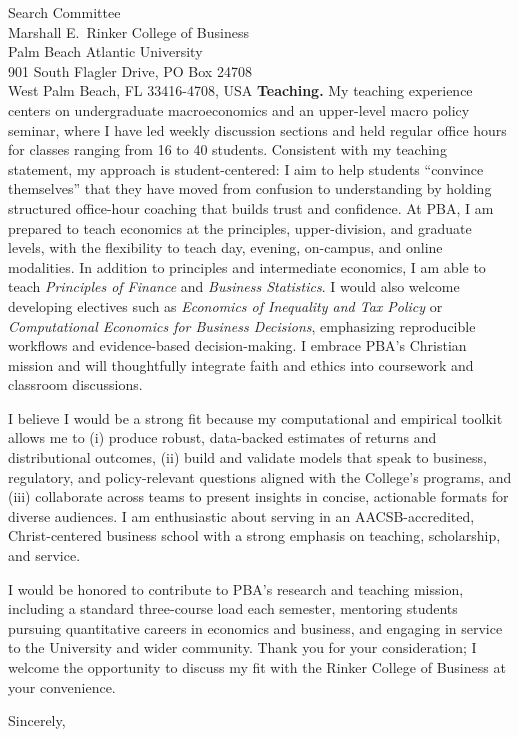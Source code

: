 \documentclass[11pt,letterpaper]{letter}
\begin{document}
\begin{letter}{Search Committee \\
Marshall E.~Rinker College of Business \\
Palm Beach Atlantic University \\
901 South Flagler Drive, PO Box 24708 \\
West Palm Beach, FL 33416-4708, USA}
\textbf{Teaching.} My teaching experience centers on undergraduate macroeconomics and an upper-level macro policy seminar, where I have led weekly discussion sections and held regular office hours for classes ranging from 16 to 40 students. Consistent with my teaching statement, my approach is student-centered: I aim to help students ``convince themselves'' that they have moved from confusion to understanding by holding structured office-hour coaching that builds trust and confidence. At PBA, I am prepared to teach economics at the principles, upper-division, and graduate levels, with the flexibility to teach day, evening, on-campus, and online modalities. In addition to principles and intermediate economics, I am able to teach \emph{Principles of Finance} and \emph{Business Statistics}. I would also welcome developing electives such as \emph{Economics of Inequality and Tax Policy} or \emph{Computational Economics for Business Decisions}, emphasizing reproducible workflows and evidence-based decision-making. I embrace PBA’s Christian mission and will thoughtfully integrate faith and ethics into coursework and classroom discussions.

I believe I would be a strong fit because my computational and empirical toolkit allows me to (i) produce robust, data-backed estimates of returns and distributional outcomes, (ii) build and validate models that speak to business, regulatory, and policy-relevant questions aligned with the College’s programs, and (iii) collaborate across teams to present insights in concise, actionable formats for diverse audiences. I am enthusiastic about serving in an AACSB-accredited, Christ-centered business school with a strong emphasis on teaching, scholarship, and service.

I would be honored to contribute to PBA’s research and teaching mission, including a standard three-course load each semester, mentoring students pursuing quantitative careers in economics and business, and engaging in service to the University and wider community. Thank you for your consideration; I welcome the opportunity to discuss my fit with the Rinker College of Business at your convenience.

\closing{Sincerely,}

\end{letter}
\end{document}
